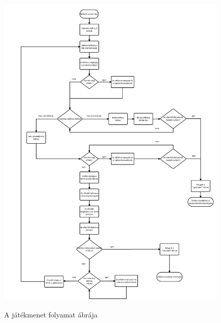 \begin{figure}[h]
        \centering
        \includegraphics[width=420px,keepaspectratio]{images/Gameplay.png}
        \label{GamplayChart}
        \caption {A játékmenet folyamat ábrája}
    \hspace{1em}
\end{figure}
